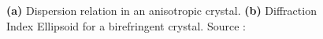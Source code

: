 \documentclass[a4paper]{scrartcl}
\numberwithin{equation}{section}
\numberwithin{figure}{section}
\numberwithin{table}{section}
\begin{document}
\begin{figure}
\centering
{}
\hfill
{}
\caption{\small \textbf{(a)} Dispersion relation in an anisotropic crystal. \textbf{(b)} Diffraction Index Ellipsoid for a birefringent crystal. Source : \cite{dickel}}
\label{fig:nonlinearofoptics}
\end{figure}
\end{document}
